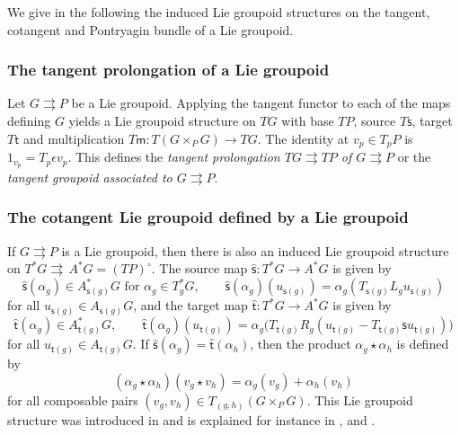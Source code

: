 \documentclass{amsart}
\theoremstyle{definition}
\begin{document}
We give in the following  the induced 
Lie groupoid structures on the tangent, cotangent and Pontryagin bundle 
of a Lie groupoid.

\subsubsection*{\textbf{The tangent prolongation of a Lie groupoid}}

Let $G{{\rightrightarrows}} P$ be a Lie groupoid. Applying the tangent functor to each of the
maps defining $G$ yields a Lie groupoid structure on $TG$ with base $TP$,
source $T{{\mathsf{s}}}$, target $T{{\mathsf{t}}}$  and multiplication $T{{\mathsf{m}}}:T(G\times _PG)\to TG$.
The identity at $v_p\in T_pP$ is $1_{v_p}=T_p\epsilon v_p$.
This defines  the \emph{tangent prolongation $TG{{\rightrightarrows}} TP$ of $G{{\rightrightarrows}} P$}
or the \emph{tangent groupoid associated to $G{{\rightrightarrows}} P$}.

\subsubsection*{\textbf{The cotangent Lie groupoid defined by a Lie groupoid}}
If $G{{\rightrightarrows}} P$ is a Lie groupoid, then there is also an induced 
Lie groupoid structure on $T^*G{{\rightrightarrows}}\, A^*G= (TP)^\circ$. The source map
$\hat{{\mathsf{s}}}:T^*G\to A^*G$ is given by 
\[\hat{{\mathsf{s}}}(\alpha_g)\in A_{{{\mathsf{s}}}(g)}^*G \text{ for } \alpha_g\in T_g^*G,\qquad 
\hat{{\mathsf{s}}}(\alpha_g)(u_{{{\mathsf{s}}}(g)})=\alpha_g(T_{{{\mathsf{s}}}(g)}L_gu_{{{\mathsf{s}}}(g)})\]
for all $u_{{{\mathsf{s}}}(g)}\in A_{{{\mathsf{s}}}(g)}G$, 
and the target map $\hat{{\mathsf{t}}}:T^*G\to A^*G$
is given by \[\hat{{\mathsf{t}}}(\alpha_g)\in A_{{{\mathsf{t}}}(g)}^*G,
\qquad \hat{{\mathsf{t}}}(\alpha_g)(u_{{{\mathsf{t}}}(g)})
=\alpha_g\bigl(T_{{{\mathsf{t}}}(g)}R_g(u_{{{\mathsf{t}}}(g)}-T_{{{\mathsf{t}}}(g)}{{\mathsf{s}}} u_{{{\mathsf{t}}}(g)})\bigr)\]
for all $u_{{{\mathsf{t}}}(g)}\in A_{{{\mathsf{t}}}(g)}G$.
If $\hat{{\mathsf{s}}}(\alpha_g)=\hat{{\mathsf{t}}}(\alpha_h)$, then the product $\alpha_g\star\alpha_h$
is defined
by 
\[(\alpha_g\star\alpha_h)(v_g\star v_h)=\alpha_g(v_g)+\alpha_h(v_h)
\]
for all composable pairs $(v_g,v_h)\in T_{(g,h)}(G\times_P G)$.
This Lie groupoid structure was introduced in \cite{CoDaWe87}
and is explained for instance in \cite{CoDaWe87}, 
\cite{Pradines88} and \cite{Mackenzie05}. 
\end{document}
